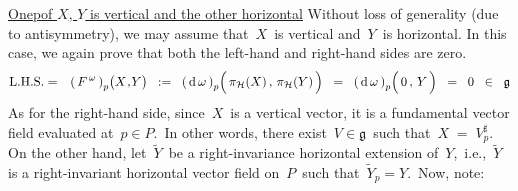 \vskip 0.3cm
\noindent
\underline{One{\color{white}p}of $X$, $Y$ is vertical and the other horizontal}
\vskip 0.1cm
\noindent
Without loss of generality (due to antisymmetry), we may assume that
\,$X$\, is vertical and \,$Y$\, is horizontal.
In this case, we again prove that both the left-hand and right-hand sides are zero.
\begin{eqnarray*}
\textnormal{L.H.S.}
& = &
	\left(\,F^{\,\omega}\,\right)_{p}\!\left(
		X
		\overset{{\color{white}1}}{,}
		Y
		\right)
\;\; := \;\;
	\left(\,\d\,\omega\,\right)_{p}\!\left(\,
		\overset{{\color{white}.}}{\pi_{\mathcal{H}}(X)}
		\,,\,
		\pi_{\mathcal{H}}(Y)
		\,\right)
\;\; = \;\;
	\left(\,\d\,\omega\,\right)_{p}\!\left(\,
		\overset{{\color{white}.}}{0}
		\,,\,
		Y
		\,\right)
\;\; = \;\;
	0
\;\; \in \;\;
	\mathfrak{g}
\end{eqnarray*}
As for the right-hand side, since \,$X$\, is a vertical vector,
it is a fundamental vector field evaluated at \,$p \in P$.\,
In other words, there exist \,$V \in \mathfrak{g}$\, such that
\,$X \; = \; V^{\sharp}_{p}$.\,
On the other hand, let \,$\widetilde{Y}$\, be a right-invariance horizontal extension of \,$Y$,\,
i.e., \,$\widetilde{Y}$\, is a right-invariant horizontal vector field on \,$P$\,
such that \,$\widetilde{Y}_{p} = Y$.\,
Now, note:
